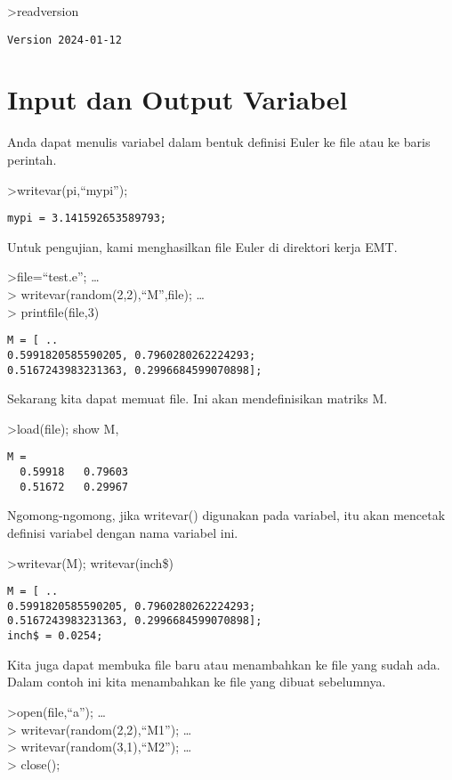 \documentclass[
]{book}
\begin{document}
\textgreater readversion

\begin{verbatim}
Version 2024-01-12
\end{verbatim}

\section{Input dan Output Variabel}\label{input-dan-output-variabel}

Anda dapat menulis variabel dalam bentuk definisi Euler ke file atau ke baris perintah.

\textgreater writevar(pi,``mypi'');

\begin{verbatim}
mypi = 3.141592653589793;
\end{verbatim}

Untuk pengujian, kami menghasilkan file Euler di direktori kerja EMT.

\textgreater file=``test.e''; \ldots{}\\
\textgreater{} writevar(random(2,2),``M'',file); \ldots{}\\
\textgreater{} printfile(file,3)

\begin{verbatim}
M = [ ..
0.5991820585590205, 0.7960280262224293;
0.5167243983231363, 0.2996684599070898];
\end{verbatim}

Sekarang kita dapat memuat file. Ini akan mendefinisikan matriks M.

\textgreater load(file); show M,

\begin{verbatim}
M = 
  0.59918   0.79603 
  0.51672   0.29967 
\end{verbatim}

Ngomong-ngomong, jika writevar() digunakan pada variabel, itu akan mencetak definisi variabel dengan nama variabel ini.

\textgreater writevar(M); writevar(inch\$)

\begin{verbatim}
M = [ ..
0.5991820585590205, 0.7960280262224293;
0.5167243983231363, 0.2996684599070898];
inch$ = 0.0254;
\end{verbatim}

Kita juga dapat membuka file baru atau menambahkan ke file yang sudah ada. Dalam contoh ini kita menambahkan ke file yang dibuat sebelumnya.

\textgreater open(file,``a''); \ldots{}\\
\textgreater{} writevar(random(2,2),``M1''); \ldots{}\\
\textgreater{} writevar(random(3,1),``M2''); \ldots{}\\
\textgreater{} close();
\end{document}

